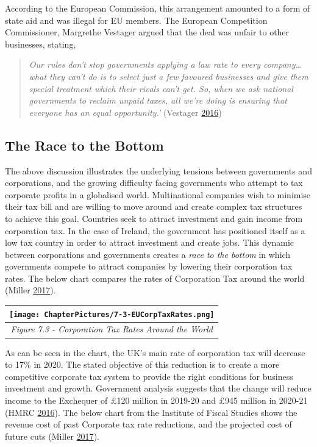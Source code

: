 \documentclass[]{tufte-handout}
\begin{document}
According to the European Commission, this arrangement amounted to a
form of state aid and was illegal for EU members. The European
Competition Commissioner, Margrethe Vestager argued that the deal was
unfair to other businesses, stating,

\begin{quote}
\emph{Our rules don't stop governments applying a law rate to every
company\ldots{}what they can't do is to select just a few favoured
businesses and give them special treatment which their rivals can't get.
So, when we ask national governments to reclaim unpaid taxes, all we're
doing is ensuring that everyone has an equal opportunity.'} (Vestager
\protect\hyperlink{ref-Vestager2016}{2016})
\end{quote}

\hypertarget{the-race-to-the-bottom}{%
\subsection{The Race to the Bottom}\label{the-race-to-the-bottom}}

The above discussion illustrates the underlying tensions between
governments and corporations, and the growing difficulty facing
governments who attempt to tax corporate profits in a globalised world.
Multinational companies wish to minimise their tax bill and are willing
to move around and create complex tax structures to achieve this goal.
Countries seek to attract investment and gain income from corporation
tax. In the case of Ireland, the government has positioned itself as a
low tax country in order to attract investment and create jobs. This
dynamic between corporations and governments creates a \emph{race to the
bottom} in which governments compete to attract companies by lowering
their corporation tax rates. The below chart compares the rates of
Corporation Tax around the world (Miller
\protect\hyperlink{ref-Miller2017}{2017}).

\begin{longtable}[]{@{}c@{}}
\toprule
\texttt{[image: ChapterPictures/7-3-EUCorpTaxRates.png]}\tabularnewline
\midrule
\endhead
\emph{Figure 7.3 - Corporation Tax Rates Around the
World}\tabularnewline
\bottomrule
\end{longtable}

As can be seen in the chart, the UK's main rate of corporation tax will
decrease to 17\% in 2020. The stated objective of this reduction is to
create a more competitive corporate tax system to provide the right
conditions for business investment and growth. Government analysis
suggests that the change will reduce income to the Exchequer of £120
million in 2019-20 and £945 million in 2020-21 (HMRC
\protect\hyperlink{ref-HMRC2015}{2016}). The below chart from the
Institute of Fiscal Studies shows the revenue cost of past Corporate tax
rate reductions, and the projected cost of future cuts (Miller
\protect\hyperlink{ref-Miller2017}{2017}).
\end{document}
